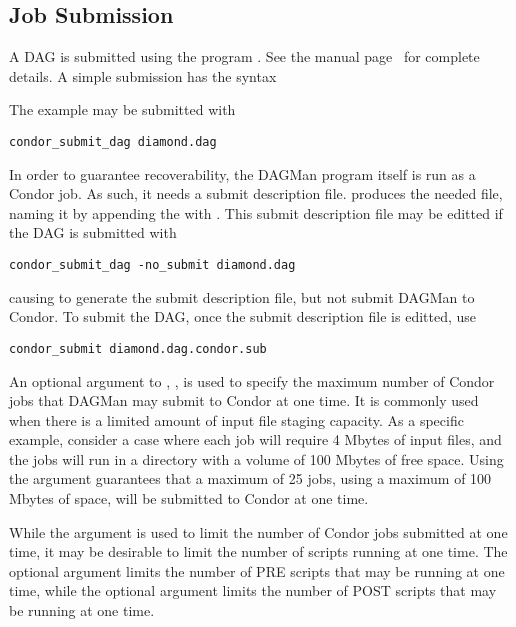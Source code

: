 \subsection{\label{dagman:submitdag}Job Submission}

A DAG is submitted using the program .
See the manual
page~\pageref{man-condor-submit}
for complete details.
A simple submission has the syntax

 

The example may be submitted with

\begin{verbatim}
condor_submit_dag diamond.dag
\end{verbatim}
In order to guarantee recoverability, the DAGMan program itself
is run as a Condor job.
As such, it needs a submit description file.
 produces the needed file,
naming it by appending the  with
.
This submit description file may be editted if the DAG is
submitted with

\begin{verbatim}
condor_submit_dag -no_submit diamond.dag
\end{verbatim}
causing  to generate the submit description file,
but not submit DAGMan to Condor.
To submit the DAG, once the submit description file is editted,
use

\begin{verbatim}
condor_submit diamond.dag.condor.sub
\end{verbatim}

An optional argument to , , 
is used to specify the maximum number of Condor jobs that DAGMan may
submit to Condor at one time.
It is commonly used when 
there is a limited amount of input file staging capacity.
As a specific example, consider a case where each job will
require 4 Mbytes of input files,
and the jobs will run in a directory with a volume of 100 Mbytes
of free space.
Using the argument  guarantees that a maximum
of 25 jobs, using a maximum of 100 Mbytes of space,
will be submitted to Condor at one time.

While the  argument is used to limit the number
of Condor jobs submitted at one time,
it may be desirable to limit the number of scripts running
at one time.
The optional  argument limits the number of PRE
scripts that may be running at one time,
while the optional  argument limits the number of POST
scripts that may be running at one time.

